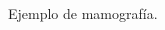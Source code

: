 \begin{figure}
\begin{multicols}{2}
		\end{multicols}
	\begin{multicols}{2}
		\par
		\par
	\end{multicols}
	\caption{Ejemplo de mamografía.} \label{fig:example-mm}
\end{figure}


